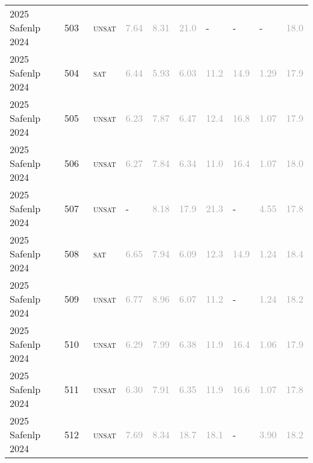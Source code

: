 \begin{center}
{\begin{longtable}{@{}llllllllll@{}}
2025 Safenlp 2024 & 503 & ~\textsc{unsat} & \textcolor{darkgray}{7.64} & \textcolor{darkgray}{8.31} & \textcolor{darkgray}{21.0} & - & - & - & \textcolor{darkgray}{18.0} \\
2025 Safenlp 2024 & 504 & ~\textsc{sat} & \textcolor{darkgray}{6.44} & \textcolor{darkgray}{5.93} & \textcolor{darkgray}{6.03} & \textcolor{darkgray}{11.2} & \textcolor{darkgray}{14.9} & \textcolor{darkgray}{1.29} & \textcolor{darkgray}{17.9} \\
2025 Safenlp 2024 & 505 & ~\textsc{unsat} & \textcolor{darkgray}{6.23} & \textcolor{darkgray}{7.87} & \textcolor{darkgray}{6.47} & \textcolor{darkgray}{12.4} & \textcolor{darkgray}{16.8} & \textcolor{darkgray}{1.07} & \textcolor{darkgray}{17.9} \\
2025 Safenlp 2024 & 506 & ~\textsc{unsat} & \textcolor{darkgray}{6.27} & \textcolor{darkgray}{7.84} & \textcolor{darkgray}{6.34} & \textcolor{darkgray}{11.0} & \textcolor{darkgray}{16.4} & \textcolor{darkgray}{1.07} & \textcolor{darkgray}{18.0} \\
2025 Safenlp 2024 & 507 & ~\textsc{unsat} & - & \textcolor{darkgray}{8.18} & \textcolor{darkgray}{17.9} & \textcolor{darkgray}{21.3} & - & \textcolor{darkgray}{4.55} & \textcolor{darkgray}{17.8} \\
2025 Safenlp 2024 & 508 & ~\textsc{sat} & \textcolor{darkgray}{6.65} & \textcolor{darkgray}{7.94} & \textcolor{darkgray}{6.09} & \textcolor{darkgray}{12.3} & \textcolor{darkgray}{14.9} & \textcolor{darkgray}{1.24} & \textcolor{darkgray}{18.4} \\
2025 Safenlp 2024 & 509 & ~\textsc{unsat} & \textcolor{darkgray}{6.77} & \textcolor{darkgray}{8.96} & \textcolor{darkgray}{6.07} & \textcolor{darkgray}{11.2} & - & \textcolor{darkgray}{1.24} & \textcolor{darkgray}{18.2} \\
2025 Safenlp 2024 & 510 & ~\textsc{unsat} & \textcolor{darkgray}{6.29} & \textcolor{darkgray}{7.99} & \textcolor{darkgray}{6.38} & \textcolor{darkgray}{11.9} & \textcolor{darkgray}{16.4} & \textcolor{darkgray}{1.06} & \textcolor{darkgray}{17.9} \\
2025 Safenlp 2024 & 511 & ~\textsc{unsat} & \textcolor{darkgray}{6.30} & \textcolor{darkgray}{7.91} & \textcolor{darkgray}{6.35} & \textcolor{darkgray}{11.9} & \textcolor{darkgray}{16.6} & \textcolor{darkgray}{1.07} & \textcolor{darkgray}{17.8} \\
2025 Safenlp 2024 & 512 & ~\textsc{unsat} & \textcolor{darkgray}{7.69} & \textcolor{darkgray}{8.34} & \textcolor{darkgray}{18.7} & \textcolor{darkgray}{18.1} & - & \textcolor{darkgray}{3.90} & \textcolor{darkgray}{18.2} \\

\end{longtable}}
\end{center}
